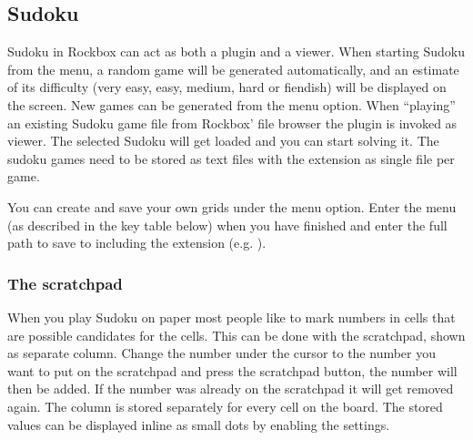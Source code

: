 \subsection{\label{ref:Sudoku}Sudoku}
Sudoku in Rockbox can act as both a plugin and a viewer.
When starting Sudoku from the  menu, a 
random game will be generated automatically, and an estimate of its difficulty
(very easy, easy, medium, hard or fiendish) will be displayed on the screen.
New games can be generated from the  menu option.
When ``playing'' an existing Sudoku game file from Rockbox' file browser
the plugin is invoked as viewer. The selected Sudoku will get loaded and you
can start solving it. The sudoku games need to be stored as text
files with the extension  as single file per game.

You can create and save your own grids under the  menu option.
Enter the menu (as described in the key table below) when you have finished and
enter the full path to save to including the  extension 
(e.g. ).

\subsubsection{The scratchpad}
When you play Sudoku on paper most people like to mark numbers in cells that 
are possible candidates for the cells.
This can be done with the scratchpad, shown as separate column.
Change the number under the cursor to the number you want to put on the
scratchpad and press the scratchpad button, the number will then be added.
If the number was already on the scratchpad it will get removed again.
The column is stored separately for every cell on the board. The stored values
can be displayed inline as small dots by enabling the 
settings.

